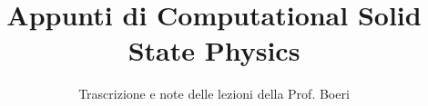\documentclass[a4paper,12pt]{article}
\title{Appunti di Computational Solid State Physics}
\author{Trascrizione e note delle lezioni della Prof. Boeri}
\date{}
\begin{document}
\maketitle
\projectintro
\tableofcontents
\newpage

\end{document}
